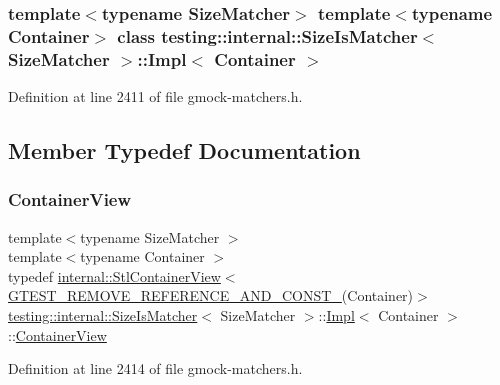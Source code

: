 \subsubsection*{template$<$typename Size\+Matcher$>$\newline
template$<$typename Container$>$\newline
class testing\+::internal\+::\+Size\+Is\+Matcher$<$ Size\+Matcher $>$\+::\+Impl$<$ Container $>$}



Definition at line 2411 of file gmock-\/matchers.\+h.



\subsection{Member Typedef Documentation}
\mbox{\label{classtesting_1_1internal_1_1SizeIsMatcher_1_1Impl_ae848755998eaaaa5e38366a2fc8b55e2}} 
\subsubsection{\texorpdfstring{Container\+View}{ContainerView}}
{\footnotesize\ttfamily template$<$typename Size\+Matcher $>$ \\
template$<$typename Container $>$ \\
typedef \hyperlink{classtesting_1_1internal_1_1StlContainerView}{internal\+::\+Stl\+Container\+View}$<$ \hyperlink{gtest-internal_8h_a874567b176266188fabfffb8393267ce}{G\+T\+E\+S\+T\+\_\+\+R\+E\+M\+O\+V\+E\+\_\+\+R\+E\+F\+E\+R\+E\+N\+C\+E\+\_\+\+A\+N\+D\+\_\+\+C\+O\+N\+S\+T\+\_\+}(Container)$>$ \hyperlink{classtesting_1_1internal_1_1SizeIsMatcher}{testing\+::internal\+::\+Size\+Is\+Matcher}$<$ Size\+Matcher $>$\+::\hyperlink{classtesting_1_1internal_1_1SizeIsMatcher_1_1Impl}{Impl}$<$ Container $>$\+::\hyperlink{classtesting_1_1internal_1_1SizeIsMatcher_1_1Impl_ae848755998eaaaa5e38366a2fc8b55e2}{Container\+View}}



Definition at line 2414 of file gmock-\/matchers.\+h.

\mbox{\label{classtesting_1_1internal_1_1SizeIsMatcher_1_1Impl_a5548da0c4c2245ca2fb520f44f0a687a}} 
